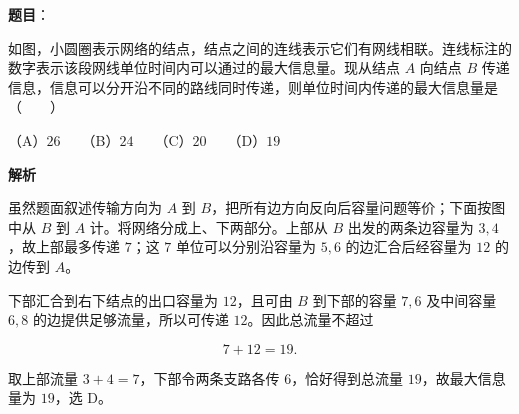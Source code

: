 \begin{answer}

\textbf{题目}：

如图，小圆圈表示网络的结点，结点之间的连线表示它们有网线相联。连线标注的数字表示该段网线单位时间内可以通过的最大信息量。现从结点 $A$ 向结点 $B$ 传递信息，信息可以分开沿不同的路线同时传递，则单位时间内传递的最大信息量是\mbox{（　　）}
\nopagebreak[4]
\begin{center}\end{center}
\nopagebreak[4]
（A）$26$　　（B）$24$　　（C）$20$　　（D）$19$

\textbf{解析}

虽然题面叙述传输方向为 $A$ 到 $B$，把所有边方向反向后容量问题等价；下面按图中从 $B$ 到 $A$ 计。将网络分成上、下两部分。上部从 $B$ 出发的两条边容量为 $3,4$，故上部最多传递 $7$；这 $7$ 单位可以分别沿容量为 $5,6$ 的边汇合后经容量为 $12$ 的边传到 $A$。

下部汇合到右下结点的出口容量为 $12$，且可由 $B$ 到下部的容量 $7,6$ 及中间容量 $6,8$ 的边提供足够流量，所以可传递 $12$。因此总流量不超过

\nopagebreak[4]
\[
7+12=19.
\]

取上部流量 $3+4=7$，下部令两条支路各传 $6$，恰好得到总流量 $19$，故最大信息量为 $19$，选 D。


\end{answer}

